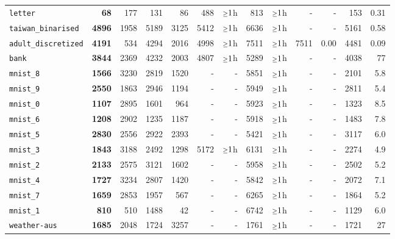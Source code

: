 \begin{tabular}{lrrrrrrrrrrrr}
\texttt{letter} & \textbf{68} & 177 & 131 & 86 & 488 & $\mathsmaller{\geq}1$h & 813 & $\mathsmaller{\geq}1$h & - & - & 153 & 0.31\\
\texttt{taiwan\_binarised} & \textbf{4896} & 1958 & 5189 & 3125 & 5412 & $\mathsmaller{\geq}1$h & 6636 & $\mathsmaller{\geq}1$h & - & - & 5161 & 0.58\\
\texttt{adult\_discretized} & \textbf{4191} & 534 & 4294 & 2016 & 4998 & $\mathsmaller{\geq}1$h & 7511 & $\mathsmaller{\geq}1$h & 7511 & 0.00 & 4481 & 0.09\\
\texttt{bank} & \textbf{3844} & 2369 & 4232 & 2003 & 4807 & $\mathsmaller{\geq}1$h & 5289 & $\mathsmaller{\geq}1$h & - & - & 4038 & 77\\
\texttt{mnist\_8} & \textbf{1566} & 3230 & 2819 & 1520 & - & - & 5851 & $\mathsmaller{\geq}1$h & - & - & 2101 & 5.8\\
\texttt{mnist\_9} & \textbf{2550} & 1863 & 2946 & 1194 & - & - & 5949 & $\mathsmaller{\geq}1$h & - & - & 2811 & 5.4\\
\texttt{mnist\_0} & \textbf{1107} & 2895 & 1601 & 964 & - & - & 5923 & $\mathsmaller{\geq}1$h & - & - & 1323 & 8.5\\
\texttt{mnist\_6} & \textbf{1208} & 2902 & 1235 & 1187 & - & - & 5918 & $\mathsmaller{\geq}1$h & - & - & 1483 & 7.8\\
\texttt{mnist\_5} & \textbf{2830} & 2556 & 2922 & 2393 & - & - & 5421 & $\mathsmaller{\geq}1$h & - & - & 3117 & 6.0\\
\texttt{mnist\_3} & \textbf{1843} & 3188 & 2492 & 1298 & 5172 & $\mathsmaller{\geq}1$h & 6131 & $\mathsmaller{\geq}1$h & - & - & 2274 & 4.9\\
\texttt{mnist\_2} & \textbf{2133} & 2575 & 3121 & 1602 & - & - & 5958 & $\mathsmaller{\geq}1$h & - & - & 2502 & 5.2\\
\texttt{mnist\_4} & \textbf{1727} & 3234 & 2807 & 1420 & - & - & 5842 & $\mathsmaller{\geq}1$h & - & - & 2072 & 7.1\\
\texttt{mnist\_7} & \textbf{1659} & 2853 & 1957 & 567 & - & - & 6265 & $\mathsmaller{\geq}1$h & - & - & 1864 & 5.2\\
\texttt{mnist\_1} & \textbf{810} & 510 & 1488 & 42 & - & - & 6742 & $\mathsmaller{\geq}1$h & - & - & 1129 & 6.0\\
\texttt{weather-aus} & \textbf{1685} & 2048 & 1724 & 3257 & - & - & 1761 & $\mathsmaller{\geq}1$h & - & - & 1721 & 27\\
\bottomrule
\end{tabular}

